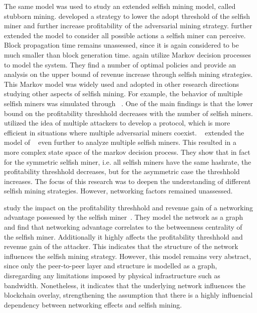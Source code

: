 The same model was used to study an extended selfish mining model, called stubborn mining.  developed a strategy to lower the adopt threshold of the selfish miner and further increase profitability of the adversarial mining strategy.
\citeauthor{optimal_sm} further extended the model to consider all possible actions a selfish miner can perceive. Block propagation time remains unassessed, since it is again considered to be much smaller than block generation time.  \citeauthor{optimal_sm} again utilize Markov decision processes to model the system. They find a number of optimal policies and provide an analysis on the upper bound of revenue increase through selfish mining strategies.
This Markov model was widely used and adopted in other research directions studying other aspects of selfish mining. For example, the behavior of multiple selfish miners was simulated through \citeauthor{multi_sm}~\cite{multi_sm}. One of the main findings is that the lower bound on the profitability threshhold decreases with the number of selfish miners.  utilized the idea of multiple attackers to develop a protocol,   which is more efficient in situations where multiple adversarial miners coexist. 
\citeauthor{deepDiveSM}~\cite{deepDiveSM} extended the model of \citeauthor{optimal_sm}~\cite{optimal_sm} even further to analyze multiple selfish miners. This resulted in a more complex state space of the markov decision process. They show that in fact for the symmetric selfish miner, i.e. all selfish miners have the same hashrate, the profitability threshhold decreases, but for the asymmetric case the threshhold increases. The focus of this research was to deepen the understanding of different selfish mining strategies. However, networking factors remained unassessed.

\citeauthor{xiao_modeling} study the impact on the profitability threshhold and revenue gain of a networking advantage possessed by the selfish miner~\cite{xiao_modeling}. They model the network as a graph and find that networking advantage correlates to the betweenness centrality of the selfish miner. Additionally it highly affects the profitability threshhold and revenue gain of the attacker. This indicates that the structure of the network influences the selfish mining strategy. However, this model remains very abstract, since only the peer-to-peer layer and structure is modelled as a graph, disregarding any limitations imposed by physical infrastructure such as bandwidth. Nonetheless, it indicates that the underlying network influences the blockchain overlay, strengthening the assumption that there is a highly influencial dependency between networking effects and selfish mining.


